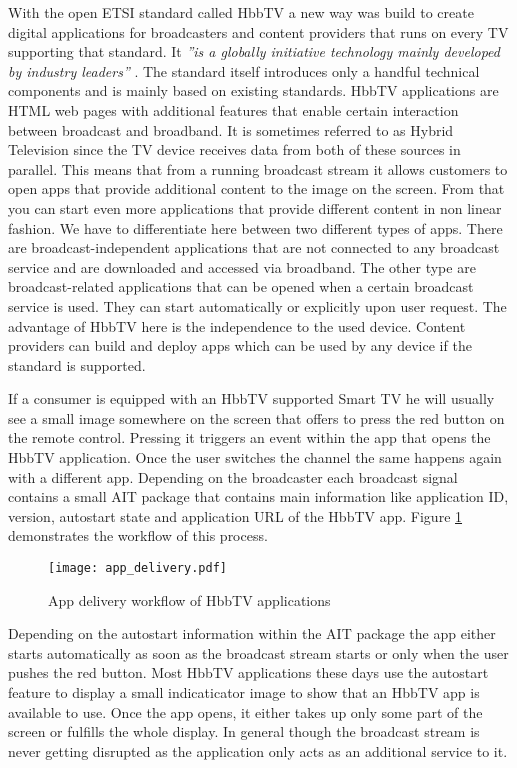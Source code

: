 With the open ETSI standard called HbbTV a new way was build to create digital applications for broadcasters and content providers that runs on every TV supporting that standard. It \textit{''is a globally initiative technology mainly developed by industry leaders''} \cite{zte}. The standard itself introduces only a handful technical components and is mainly based on existing standards. HbbTV applications are HTML web pages with additional features that enable certain interaction between broadcast and broadband. It is sometimes referred to as Hybrid Television since the TV device receives data from both of these sources in parallel. This means that from a running broadcast stream it allows customers to open apps that provide additional content to the image on the screen. From that you can start even more applications that provide different content in non linear fashion. We have to differentiate here between two different types of apps. There are broadcast-independent applications that are not connected to any broadcast service and are downloaded and accessed via broadband. The other type are broadcast-related applications that can be opened when a certain broadcast service is used. They can start automatically or explicitly upon user request. The advantage of HbbTV here is the independence to the used device. Content providers can build and deploy apps which can be used by any device if the standard is supported.

If a consumer is equipped with an HbbTV supported Smart TV he will usually see a small image somewhere on the screen that offers to press the red button on the remote control. Pressing it triggers an event within the app that opens the HbbTV application. Once the user switches the channel the same happens again with a different app. Depending on the broadcaster each broadcast signal contains a small AIT package that contains main information like application ID, version, autostart state and application URL of the HbbTV app. Figure \ref{fig:app_delivery} demonstrates the workflow of this process.

\begin{figure}[htb]
  \centering
  \texttt{[image: app\_delivery.pdf]}\\
  \caption{App delivery workflow of HbbTV applications}\label{fig:app_delivery}
\end{figure}

Depending on the autostart information within the AIT package the app either starts automatically as soon as the broadcast stream starts or only when the user pushes the red button. Most HbbTV applications these days use the autostart feature to display a small indicaticator image to show that an HbbTV app is available to use. Once the app opens, it either takes up only some part of the screen or fulfills the whole display. In general though the broadcast stream is never getting disrupted as the application only acts as an additional service to it.

